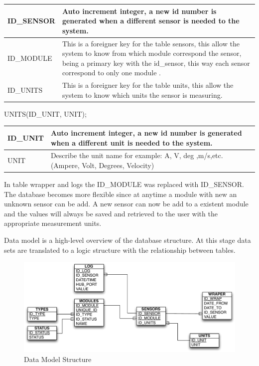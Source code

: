 \begin{table}[H]
\centering
	\begin{tabular}{| p{2cm} | p{10cm} |}
		\hline
		ID\_SENSOR & Auto increment integer, a new id number is generated when a different sensor is needed to the system. \\\hline
		ID\_MODULE & This is a foreigner key for the table sensors, this allow the system to know from which module correspond the sensor, being a primary key with the id\_sensor, this way each sensor correspond to only one module .\\\hline
		ID\_UNITS & This is a foreigner key for the table units, this allow the system to know which units the sensor is measuring.\\\hline
	\end{tabular}
\end{table}

UNITS(ID\_UNIT, UNIT);

\begin{table}[H]
\centering
	\begin{tabular}{| p{2cm} | p{10cm} |}
		\hline
		ID\_UNIT & Auto increment integer, a new id number is generated when a different unit is needed to the system. \\\hline
		UNIT & Describe the unit name for example: A, V, deg ,m/s,etc. (Ampere, Volt, Degrees, Velocity)\\\hline
	\end{tabular}
\end{table}

In table wrapper and logs the ID\_MODULE was replaced with ID\_SENSOR. The database becomes more flexible since at anytime a module with new an unknown sensor can be add. A new sensor can now be add to a existent module and the values will always be saved and retrieved to the user with the appropriate measurement units.


Data model is a high-level overview of the database structure. At this stage data sets are translated to a logic structure with the relationship between tables.

\begin{figure}[H]
	\begin{centering}
		\includegraphics[width=1.0\textwidth]{images/db_structure.pdf}
		\caption{Data Model Structure}
	\end{centering}
\end{figure}


